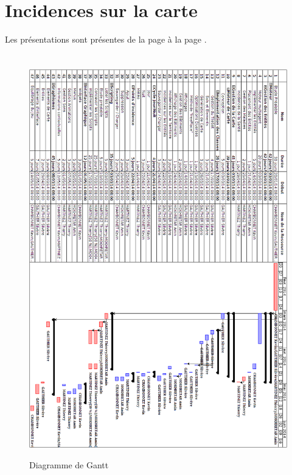 \documentclass[a4paper]{memoir}
\begin{document}
		\section{Incidences sur la carte}
			Les présentations sont présentes de la page \pageref{fig:dilatation} à la page \pageref{fig:aleatoire}.
			
		\section*{}
			\begin{figure}
				\vspace{-3,5cm} \hspace{-4,5cm} \includegraphics[scale=0.6]{img/Gantt.png}
				\label{fig:gantt}
				\vspace{-0,5cm} \caption{Diagramme de Gantt}
			\end{figure}
			
\end{document}

